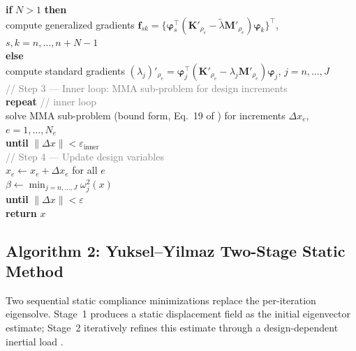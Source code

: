 \documentclass[12pt,a4paper]{article}
\newcommand{\kw}[1]{\textbf{#1}}          %
\newcommand{\var}[1]{\textit{#1}}         %
\newcommand{\cm}[1]{\textcolor{gray}{#1}} %
\newcommand{\ind}{\hspace*{1.4em}}        %
\newcommand{\indd}{\hspace*{2.8em}}       %
\newcommand{\assign}{\ensuremath{\leftarrow}}%
\begin{document}
\begin{algobox}
\ind\kw{if} $N > 1$ \kw{then}\\
\indd compute generalized gradients
      $\mathbf{f}_{sk}=\{\boldsymbol{\varphi}_s^{\top}
      (\mathbf{K}'_{\rho_e}-\tilde{\lambda}\mathbf{M}'_{\rho_e})
      \boldsymbol{\varphi}_k\}^{\top}$,\;
      $s,k=n,\ldots,n{+}N{-}1$\\
\ind\kw{else}\\
\indd compute standard gradients
      $(\lambda_j)'_{\rho_e}=
      \boldsymbol{\varphi}_j^{\top}
      (\mathbf{K}'_{\rho_e}-\lambda_j\mathbf{M}'_{\rho_e})
      \boldsymbol{\varphi}_j$,\;
      $j=n,\ldots,J$\\[3pt]
%
\ind\cm{// Step 3 — Inner loop: MMA sub-problem for design increments}\\
\ind\kw{repeat} \cm{// inner loop}\\
\indd solve MMA sub-problem (bound form, Eq.~19 of \cite{Olhoff2014})
      for increments $\Delta x_e$,\; $e=1,\ldots,N_e$\\
\ind\kw{until} $\|\Delta\var{x}\| < \varepsilon_{\mathrm{inner}}$\\[3pt]
%
\ind\cm{// Step 4 — Update design variables}\\
\ind $x_e \assign x_e + \Delta x_e$ \quad for all $e$\\
\ind $\beta \assign \min_{j=n,\ldots,J}\omega_j^2(\var{x})$\\[4pt]
%
\kw{until} $\|\Delta\var{x}\| < \varepsilon$\\[4pt]
\kw{return} $x$
\end{algobox}

\subsection{Algorithm 2: Yuksel--Yilmaz Two-Stage Static Method}
\label{subsec:alg-yuksel}

Two sequential static compliance minimizations replace the per-iteration
eigensolve.
Stage~1 produces a static displacement field as the initial eigenvector
estimate; Stage~2 iteratively refines this estimate through a
design-dependent inertial load \cite{Yuksel2025}.
\end{document}
